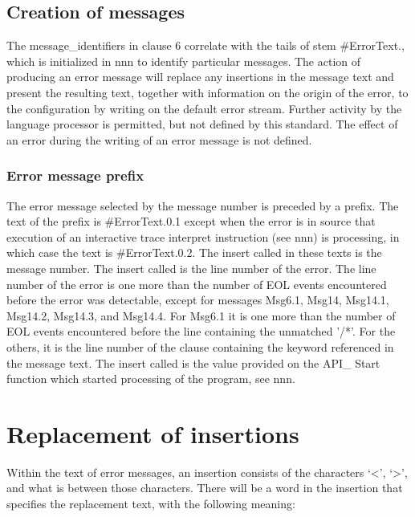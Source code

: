 \hypertarget{creation-of-messages}{%
\subsection{Creation of messages}\label{creation-of-messages}}

The message\_identifiers in clause 6 correlate with the tails of stem
\#ErrorText., which is initialized in nnn to identify particular
messages. The action of producing an error message will replace any
insertions in the message text and present the resulting text, together
with information on the origin of the error, to the configuration by
writing on the default error stream. Further activity by the language
processor is permitted, but not defined by this standard. The effect of
an error during the writing of an error message is not defined.

\hypertarget{error-message-prefix}{%
\subsubsection{Error message prefix}\label{error-message-prefix}}

The error message selected by the message number is preceded by a
prefix. The text of the prefix is \#ErrorText.0.1 except when the error
is in source that execution of an interactive trace interpret
instruction (see nnn) is processing, in which case the text is
\#ErrorText.0.2. The insert called in these texts is the message number.
The insert called is the line number of the error. The line number of
the error is one more than the number of EOL events encountered before
the error was detectable, except for messages Msg6.1, Msg14, Msg14.1,
Msg14.2, Msg14.3, and Msg14.4. For Msg6.1 it is one more than the number
of EOL events encountered before the line containing the unmatched '/*'.
For the others, it is the line number of the clause containing the
keyword referenced in the message text. The insert called is the value
provided on the API\_ Start function which started processing of the
program, see nnn.

\hypertarget{replacement-of-insertions}{%
\section{Replacement of insertions}\label{replacement-of-insertions}}

Within the text of error messages, an insertion consists of the
characters `\textless{}', `\textgreater{}', and what is between those
characters. There will be a word in the insertion that specifies the
replacement text, with the following meaning:

